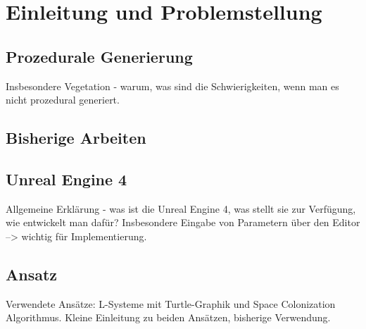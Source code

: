 \chapter{Einleitung und Problemstellung}

\section{Prozedurale Generierung}

Insbesondere Vegetation - warum, was sind die Schwierigkeiten, wenn man es nicht prozedural generiert.

\section{Bisherige Arbeiten}

\section{Unreal Engine 4}

Allgemeine Erklärung - was ist die Unreal Engine 4, was stellt sie zur Verfügung, wie entwickelt man dafür? Insbesondere Eingabe von Parametern über den Editor --> wichtig für Implementierung.



\section{Ansatz}
Verwendete Ansätze: L-Systeme mit Turtle-Graphik und Space Colonization Algorithmus. Kleine Einleitung zu beiden Ansätzen, bisherige Verwendung.